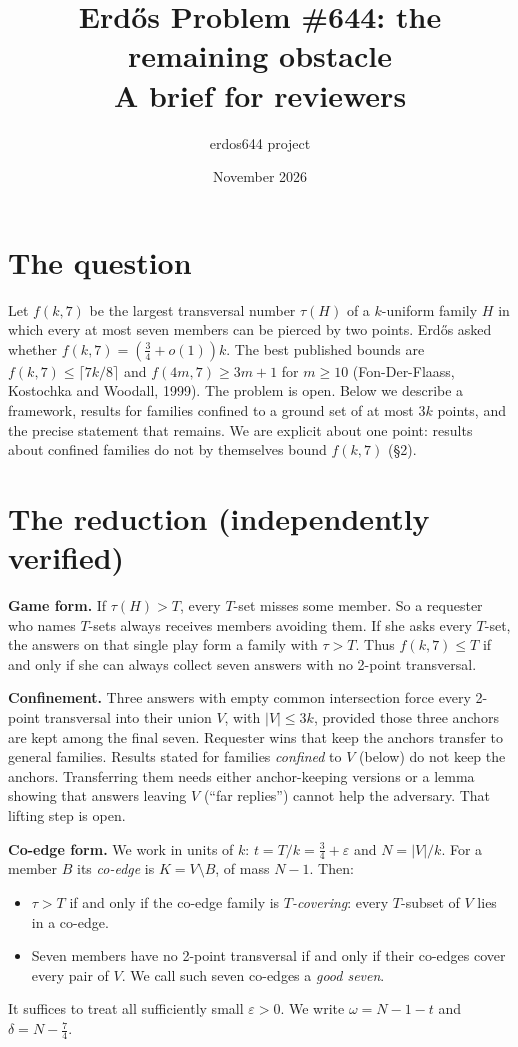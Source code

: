 \documentclass[11pt]{article}
\title{Erd\H{o}s Problem \#644: the remaining obstacle\\[2pt]\large A brief for reviewers}
\author{erdos644 project}
\date{November 2026}
\begin{document}
\maketitle

\section{The question}
Let $f(k,7)$ be the largest transversal number $\tau(H)$ of a $k$-uniform family $H$ in which every at most seven
members can be pierced by two points. Erd\H{o}s asked whether $f(k,7)=(\tfrac34+o(1))k$. The best published bounds are
$f(k,7)\le\lceil 7k/8\rceil$ and $f(4m,7)\ge 3m+1$ for $m\ge 10$ (Fon-Der-Flaass, Kostochka and Woodall, 1999).
The problem is open. Below we describe a framework, results for families confined to a ground set of at most $3k$
points, and the precise statement that remains. We are explicit about one point: results about confined families do
not by themselves bound $f(k,7)$ (\S2).

\section{The reduction (independently verified)}
\textbf{Game form.} If $\tau(H)>T$, every $T$-set misses some member. So a requester who names $T$-sets always receives
members avoiding them. If she asks every $T$-set, the answers on that single play form a family with $\tau>T$. Thus
$f(k,7)\le T$ if and only if she can always collect seven answers with no 2-point transversal.

\textbf{Confinement.} Three answers with empty common intersection force every 2-point transversal into their union
$V$, with $|V|\le 3k$, provided those three anchors are kept among the final seven. Requester wins that keep the
anchors transfer to general families. Results stated for families \emph{confined} to $V$ (below) do not keep the
anchors. Transferring them needs either anchor-keeping versions or a lemma showing that answers leaving $V$ (``far
replies'') cannot help the adversary. That lifting step is open.

\textbf{Co-edge form.} We work in units of $k$: $t=T/k=\tfrac34+\varepsilon$ and $N=|V|/k$. For a member $B$ its
\emph{co-edge} is $K=V\setminus B$, of mass $N-1$. Then:
\begin{itemize}
\item $\tau>T$ if and only if the co-edge family is \emph{$T$-covering}: every $T$-subset of $V$ lies in a co-edge.
\item Seven members have no 2-point transversal if and only if their co-edges cover every pair of $V$. We call such
seven co-edges a \emph{good seven}.
\end{itemize}
It suffices to treat all sufficiently small $\varepsilon>0$. We write $\omega=N-1-t$ and $\delta=N-\tfrac74$.
\end{document}
